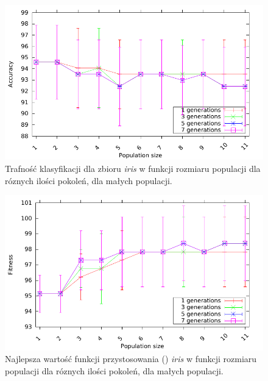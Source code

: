 %	
	\begin{figure}
		\includegraphics[scale=0.90]{figures/results/accuracy/accuracy-iris-detailed}
		\caption{Trafność klasyfikacji dla zbioru \emph{iris} w funkcji rozmiaru populacji dla róznych ilości pokoleń, dla małych populacji.	\label{fig:acc-iris-detailed}}
	\end{figure}	
	
	
	\begin{figure}
		\includegraphics[scale=0.90]{figures/results/fitness/fitness-iris-detailed}
		\caption{Najlepsza wartość funkcji przystosowania ()  \emph{iris} w funkcji rozmiaru populacji dla róznych ilości pokoleń, dla małych populacji.	\label{fig:fit-iris-detailed}}
	\end{figure}	
	
